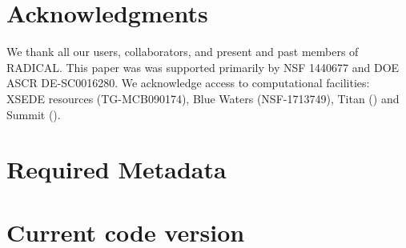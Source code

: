 \documentclass[preprint,12pt, a4paper]{elsarticle}
\begin{document}
\section*{Acknowledgments}

We thank all our users, collaborators, and present and past members of
RADICAL. This paper was was supported primarily by NSF 1440677 and DOE ASCR
DE-SC0016280. We acknowledge access to computational facilities: XSEDE
resources (TG-MCB090174), Blue Waters (NSF-1713749), Titan () and Summit ().


 



\appendix


\section*{Required Metadata}\label{sec:metadata}


\section*{Current code version}\label{sec:src_version}

\end{document}
